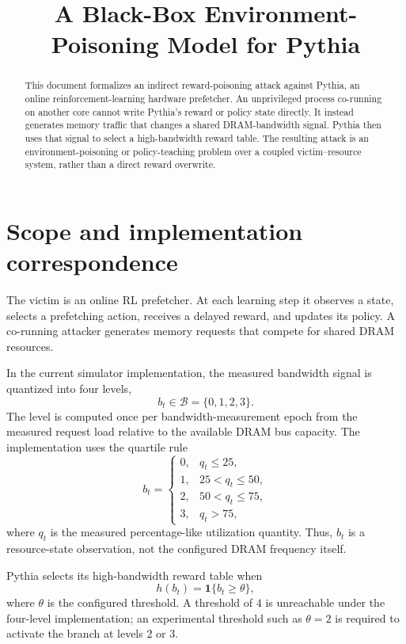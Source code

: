 \documentclass[11pt]{article}
\title{A Black-Box Environment-Poisoning Model for Pythia}
\author{}
\date{}
\newcommand{\Bspace}{\mathcal{B}}
\begin{document}
\maketitle

\begin{abstract}
This document formalizes an indirect reward-poisoning attack against Pythia, an online reinforcement-learning hardware prefetcher. An unprivileged process co-running on another core cannot write Pythia's reward or policy state directly. It instead generates memory traffic that changes a shared DRAM-bandwidth signal. Pythia then uses that signal to select a high-bandwidth reward table. The resulting attack is an environment-poisoning or policy-teaching problem over a coupled victim--resource system, rather than a direct reward overwrite.
\end{abstract}

\section{Scope and implementation correspondence}

The victim is an online RL prefetcher. At each learning step it observes a state, selects a prefetching action, receives a delayed reward, and updates its policy. A co-running attacker generates memory requests that compete for shared DRAM resources.

In the current simulator implementation, the measured bandwidth signal is quantized into four levels,
\[
  b_t \in \Bspace = \{0,1,2,3\}.
\]
The level is computed once per bandwidth-measurement epoch from the measured request load relative to the available DRAM bus capacity. The implementation uses the quartile rule
\[
 b_t =
 \begin{cases}
 0, & q_t \leq 25,\\
 1, & 25 < q_t \leq 50,\\
 2, & 50 < q_t \leq 75,\\
 3, & q_t > 75,
 \end{cases}
\]
where $q_t$ is the measured percentage-like utilization quantity. Thus, $b_t$ is a resource-state observation, not the configured DRAM frequency itself.

Pythia selects its high-bandwidth reward table when
\[
 h(b_t) = \mathbf{1}\{b_t \geq \theta\},
\]
where $\theta$ is the configured threshold. A threshold of $4$ is unreachable under the four-level implementation; an experimental threshold such as $\theta=2$ is required to activate the branch at levels $2$ or $3$.
\end{document}
